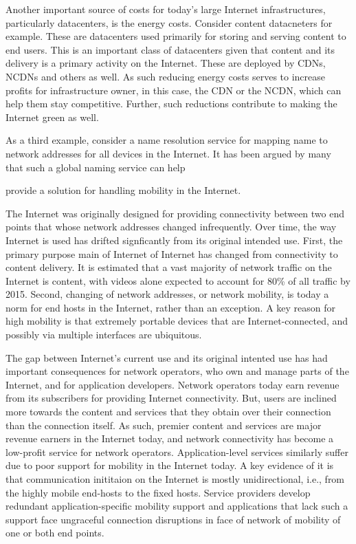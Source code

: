 Another important source of costs for today's large Internet infrastructures, particularly datacenters, is the energy costs. Consider content datacneters for example. These are datacenters used primarily for storing and serving content to end users. This is an important class of datacenters given that content and its delivery is a primary activity on the Internet. These are deployed by CDNs, NCDNs and others as well. As such reducing energy costs serves to increase profits for infrastructure owner, in this case, the CDN or the NCDN, which can help them stay competitive. Further, such reductions contribute to making the Internet green as well. 

As a third example, consider a name resolution service for mapping name to network addresses for all devices in the Internet. It has been argued by many that such a global naming service can help 

provide a solution for handling mobility in the Internet. 



The Internet was originally designed for providing connectivity between two end points that whose network addresses changed infrequently. Over time, the way Internet is used has drifted signficantly from its original intended use. 
First, the primary purpose main of Internet of Internet has changed from connectivity to content delivery. It is estimated that a vast majority of network traffic on the Internet is content, with videos alone expected to account for 80\% of all traffic by 2015. Second, changing of network addresses, or network mobility, is today a norm for end hosts in the Internet, rather than an exception. 
A key reason for high mobility is that extremely portable devices that are Internet-connected, and possibly via multiple interfaces are ubiquitous. 

The gap between Internet's current use and its original intented use has had important consequences for network operators, who own and manage parts of the Internet, and for application developers. Network operators today earn revenue from its subscribers for providing Internet connectivity. But, users are inclined more towards the content and services that they obtain over their connection than the connection itself. As such, premier content and services are major revenue earners in the Internet today, and network connectivity has become a low-profit service for network operators. Application-level services similarly suffer due to poor support for mobility in the Internet today. A key evidence of it is that communication inititaion on the Internet is mostly unidirectional, i.e., from the highly mobile end-hosts to the fixed hosts. Service providers develop redundant application-specific mobility support and applications that lack such a support face ungraceful connection disruptions in face of network of mobility of one or both end points.


